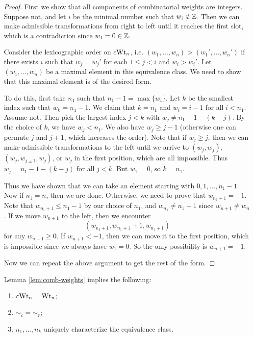 \begin{proof}
  First we show that all components of
  combinatorial weights are integers.
  Suppose not, and
  let $i$ be the minimal number such
  that $w_i \notin \mathbb{Z}$. Then we can make
  admissible transformations from right
  to left until it reaches the first slot,
  which is a contradiction since
  $w_1 = 0 \in \mathbb{Z}$.

  Consider the lexicographic order
  on $c {\operatorname{Wt}_n}$, i.e.
  $(w_1, \dots, w_n) > (w_1', \dots, w_n')$
  if there exists $i$ such that
  $w_j = w_j'$ for each $1 \le j < i$
  and $w_i > w_i'$. Let
  $(w_1, \dots, w_n)$ be a maximal
  element in this equivalence class.
  We need to show that this maximal
  element is of the desired form.

  To do this, first take $n_1$ such that
  $n_1 - 1 = \max\{w_i\}$. Let $k$
  be the smallest index such that
  $w_k = n_1 - 1$. We claim that
  $k = n_1$ and $w_i = i - 1$ for all
  $i < n_1$. Assume not. Then pick
  the largest index $j < k$ with
  $w_j \ne n_1 - 1 - (k - j)$. By the
  choice of $k$, we have
  $w_j < n_1$. We also have
  $w_j \ge j - 1$ (otherwise one can
  permute $j$ and $j + 1$, which
  increases the order). Note that if
  $w_j \ge j$, then we can make admissible
  transformations to the left until
  we arrive to $(w_j, w_j)$,
  $(w_j, w_{j \pm 1}, w_j)$, or
  $w_j$ in the first position, which are
  all impossible. Thus $w_j = n_1 - 1 - (k - j)$
  for all $j < k$. But $w_1 = 0$, so
  $k = n_1$.

  Thus we have shown that we can take
  an element starting with
  $0, 1, \dots, n_1 - 1$. Now if
  $n_1 = n$, then we are done. Otherwise,
  we need to prove that $w_{n_1 + 1} = -1$.
  Note that $w_{n_1 + 1} \le n_1 - 1$
  by our choice of $n_1$, and
  $w_{n_1} \ne n_1 - 1$ since
  $w_{n + 1} \ne w_n$. If
  we move $w_{n + 1}$ to the left,
  then we encounter
  \[
    (w_{n_1 + 1}, w_{n_1 + 1} + 1, w_{n_1 + 1})
  \]
  for any $w_{n + 1} \ge 0$. If
  $w_{n + 1} < -1$, then we can move it
  to the first position, which is impossible
  since we always have $w_1 = 0$. So the only possibility
  is $w_{n + 1} = -1$.

  Now we can repeat the above argument
  to get the rest of the form.
\end{proof}

\begin{remark}
  Lemma \ref{lem:comb-weights}
  implies the following:
  \begin{enumerate}
    \item $c {\operatorname{Wt}_n} = \operatorname{Wt}_n$;
    \item ${\sim_c} = {\sim_r}$;
    \item $n_1, \dots, n_k$ uniquely
      characterize the equivalence class.
  \end{enumerate}
\end{remark}

